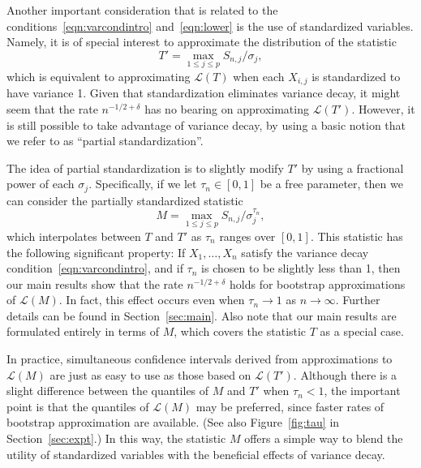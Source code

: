 \documentclass[aos,preprint]{imsart}
\numberwithin{equation}{section}
\theoremstyle{plain}
\renewcommand{\L}{\mathcal{L}}
\newcommand{\1}{{\bf{1}}}
\newcommand{\0}{\mathbf{0}}
\begin{document}
Another important consideration that is related to the conditions~\eqref{eqn:varcondintro} and~\eqref{eqn:lower} is the use of standardized variables. Namely, it is of special interest to approximate the distribution of the statistic
$$T'=\max_{1\leq j\leq p} S_{n,j}/\sigma_j,$$
which is equivalent to approximating $\L(T)$ when each $X_{i,j}$ is standardized to have variance 1. Given that standardization eliminates variance decay, it might seem that the rate $n^{-1/2+\delta}$ has no bearing on approximating $\L(T')$. However, it is still possible to take advantage of variance decay, by using a basic notion that we refer to as ``partial standardization''.

The idea of partial standardization is to slightly modify $T'$ by using a fractional power of each $\sigma_j$. Specifically, if we let $\tau_n\in [0,1]$ be a free parameter, then we can consider the partially standardized statistic
\begin{equation}\label{eqn:mdef}
M=\max_{1\leq j\leq p} S_{n,j}/\sigma_j^{\tau_n},
\end{equation}
%
which interpolates between $T$ and $T'$ as $\tau_n$ ranges over $[0,1]$.
This statistic has the following significant property: If $X_1,\dots,X_n$ satisfy the variance decay condition~\eqref{eqn:varcondintro}, and if $\tau_n$ is chosen to be slightly less than 1, then our main results show that the rate $n^{-1/2+\delta}$ holds for bootstrap approximations of $\L(M)$. In fact, this effect occurs even when $\tau_n\to 1$ as $n\to\infty$. Further details can be found in Section~\ref{sec:main}. Also note that our main results are formulated entirely in terms of $M$, which covers the statistic $T$ as a special case.

In practice, simultaneous confidence intervals derived from approximations to $\L(M)$ are just as easy to use as those based on $\L(T')$. Although there is a slight difference between the quantiles of $M$ and $T'$ when $\tau_n<1$, the important point is that the quantiles of $\L(M)$ may be preferred, since faster rates of bootstrap approximation are available. (See also Figure~\ref{fig:tau} in Section~\ref{sec:expt}.)
In this way, the statistic $M$ offers a simple way to blend the utility of standardized variables with the beneficial effects of variance decay. 
\end{document}
